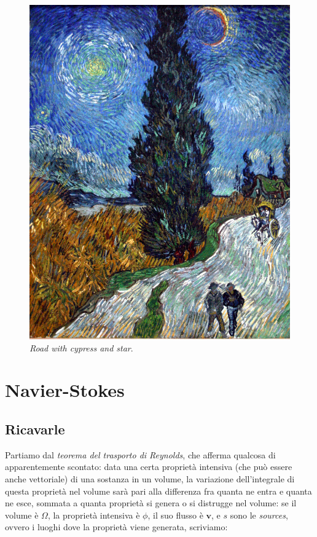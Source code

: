 \documentclass[12pt,a4paper]{article}
\numberwithin{equation}{section}
\begin{document}
\begin{figure}
    \centering
    \includegraphics[scale=0.12]{road_cypress.jpg}
    \caption{\emph{Road with cypress and star}.}
    \label{road}
\end{figure}

\section{Navier-Stokes}

\subsection{Ricavarle}

Partiamo \cite{derivationns} dal \emph{teorema del trasporto di Reynolds}, che afferma qualcosa di apparentemente scontato: data una certa proprietà intensiva (che può essere anche vettoriale) di una sostanza in un volume, la variazione dell'integrale di questa proprietà nel volume sarà pari alla differenza fra quanta ne entra e quanta ne esce, sommata a quanta proprietà si genera o si distrugge nel volume: se il volume è $\Omega$, la proprietà intensiva è $\phi$, il suo flusso è $\mathbf{v}$, e $s$ sono le \emph{sources}, ovvero i luoghi dove la proprietà viene generata, scriviamo:
\end{document}
